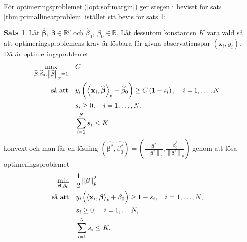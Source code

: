 \documentclass[a4paper, 12pt]{report}
\theoremstyle{definition}
\newtheorem{thm}{Sats}[section]
\newtheorem{cor}[thm]{Korollarium}
\theoremstyle{remark}
\newcommand{\bfbeta}{{\boldsymbol{\beta}}}
\newcommand{\bfx}{\mathbf{x}}
\newcommand{\llangle}{\left\langle}
\newcommand{\rrangle}{\right\rangle}
\newcommand{\inner}[2]{\llangle #1, #2 \rrangle}
\begin{document}
För optimeringsproblemet (\ref{opt:softmargin}) ger stegen i beviset för sats \ref{thm:primallinearproblem} istället ett bevis för sats \ref{thm:primalsoftmargin}:
\begin{thm}\label{thm:primalsoftmargin}
	Låt $\widehat{\bfbeta},~\bfbeta \in \mathbb{R}^p$ och $\widehat{\beta}_0,~\beta_0 \in \mathbb{R}$. Låt dessutom konstanten $K$ vara vald så att optimeringsproblemens krav är lösbara för givna observationspar $\left(\mathbf{x}_i,y_i\right)$. Då är optimeringsproblemet
	\begin{equation*}
	\begin{aligned}
	\operatornamewithlimits{max}_{\widehat{\bfbeta},\widehat{\beta}_0,\left\|\widehat{\bfbeta}
\right\|_p=1} & & &C\\
	\text{så att} & & &y_i\left(\inner{\bfx_i}{\widehat{\bfbeta}}_p+\widehat{\beta}_0\right)\geq C\left(1-s_i\right),\quad i=1,\dots,N,\\
	& & &s_i\geq0,\quad i=1,\dots,N,\\
	& & &\sum_{i=1}^{N}s_i \leq K
	\end{aligned}
	\end{equation*}
	konvext och man får en lösning $\left(\widehat{\bfbeta^*},\widehat{\beta^*_0}\right)=\left(\frac{\bfbeta^*}{\left\|\bfbeta^*\right\|_p}, \frac{\beta^*_0}{\left\|\bfbeta^*\right\|_p}\right)$ genom att lösa optimeringsproblemet
	\begin{equation*}
	\begin{aligned}
	\operatornamewithlimits{min}_{\bfbeta,\beta_0} & & &\frac{1}{2}\left\|\bfbeta
\right\|_p^2\\
	\text{så att} & & &y_i\left(\inner{\bfx_i}{\bfbeta}_p+\beta_0\right)\geq 1 - s_i,\quad i=1,\dots,N,\\
	& & &s_i\geq0,\quad i=1,\dots N,\\
	& & &\sum_{i=1}^{N} s_i \leq K.
	\end{aligned}
	\end{equation*}
\end{thm}

\end{document}
